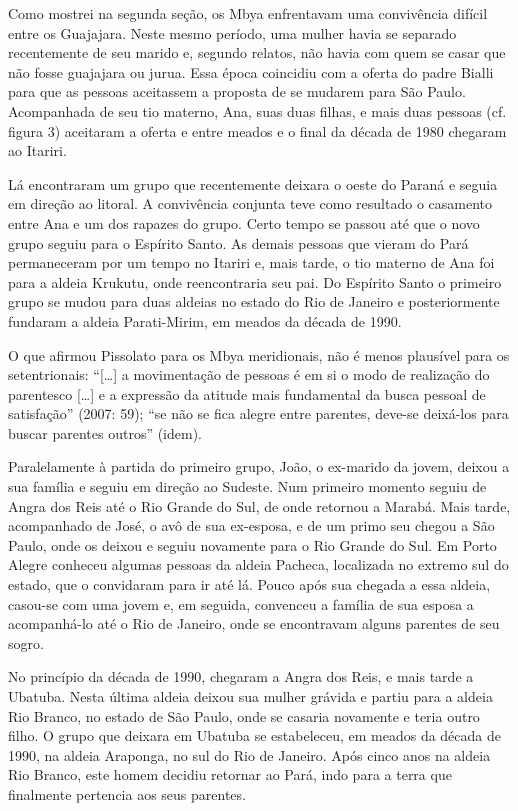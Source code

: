 Como mostrei na segunda seção, os Mbya enfrentavam uma convivência
difícil entre os Guajajara. Neste mesmo período, uma mulher havia se
separado recentemente de seu marido e, segundo relatos, não havia com
quem se casar que não fosse guajajara ou jurua. Essa época coincidiu
com a oferta do padre Bialli para que as pessoas aceitassem a proposta
de se mudarem para São Paulo. Acompanhada de seu tio materno, Ana, suas
duas filhas, e mais duas pessoas (cf. figura 3) aceitaram a oferta e
entre meados e o final da década de 1980 chegaram ao Itariri.

Lá encontraram um grupo que recentemente deixara o oeste do Paraná e
seguia em direção ao litoral. A convivência conjunta teve como
resultado o casamento entre Ana e um dos rapazes do grupo. Certo tempo
se passou até que o novo grupo seguiu para o Espírito Santo. As demais
pessoas que vieram do Pará permaneceram por um tempo no Itariri e, mais
tarde, o tio materno de Ana foi para a aldeia Krukutu, onde
reencontraria seu pai. Do Espírito Santo o primeiro grupo se mudou para
duas aldeias no estado do Rio de Janeiro e posteriormente fundaram a
aldeia Parati-Mirim, em meados da década de 1990.

O que afirmou Pissolato para os Mbya meridionais, não é menos plausível
para os setentrionais: ``[\ldots{}] a movimentação de pessoas é em si o modo
de realização do parentesco [\ldots{}] e a expressão da atitude mais
fundamental da busca pessoal de satisfação'' (2007: 59); ``se não se fica
alegre entre parentes, deve-se deixá-los para buscar parentes outros''
(idem).

Paralelamente à partida do primeiro grupo, João, o ex-marido da jovem,
deixou a sua família e seguiu em direção ao Sudeste. Num primeiro
momento seguiu de Angra dos Reis até o Rio Grande do Sul, de onde
retornou a Marabá. Mais tarde, acompanhado de José, o avô de sua
ex-esposa, e de um primo seu chegou a São Paulo, onde os deixou e
seguiu novamente para o Rio Grande do Sul. Em Porto Alegre conheceu
algumas pessoas da aldeia Pacheca, localizada no extremo sul do estado,
que o convidaram para ir até lá. Pouco após sua chegada a essa aldeia,
casou-se com uma jovem e, em seguida, convenceu a família de sua esposa
a acompanhá-lo até o Rio de Janeiro, onde se encontravam alguns
parentes de seu sogro.

No princípio da década de 1990, chegaram a Angra dos Reis, e mais tarde
a Ubatuba. Nesta última aldeia deixou sua mulher grávida e partiu para
a aldeia Rio Branco, no estado de São Paulo, onde se casaria novamente
e teria outro filho. O grupo que deixara em Ubatuba se estabeleceu, em
meados da década de 1990, na aldeia Araponga, no sul do Rio de Janeiro.
Após cinco anos na aldeia Rio Branco, este homem decidiu retornar ao
Pará, indo para a terra que finalmente pertencia aos seus parentes.

